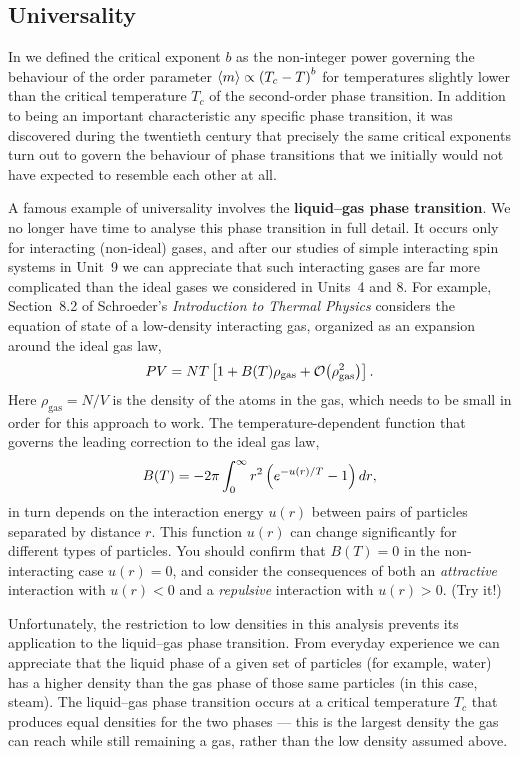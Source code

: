 \subsection{Universality}
In  we defined the critical exponent $b$ as the non-integer power governing the behaviour of the order parameter $\left\langle m \right\rangle \propto \left(T_c - T\right)^b$ for temperatures slightly lower than the critical temperature $T_c$ of the second-order phase transition.
In addition to being an important characteristic any specific phase transition, it was discovered during the twentieth century that precisely the same critical exponents turn out to govern the behaviour of phase transitions that we initially would not have expected to resemble each other at all.

A famous example of universality involves the \textbf{liquid--gas phase transition}.
We no longer have time to analyse this phase transition in full detail.
It occurs only for interacting (non-ideal) gases, and after our studies of simple interacting spin systems in Unit~9 we can appreciate that such interacting gases are far more complicated than the ideal gases we considered in Units~4 and 8.
For example, Section~8.2 of Schroeder's \textit{Introduction to Thermal Physics} considers the equation of state of a low-density interacting gas, organized as an expansion around the ideal gas law,
\begin{equation*}
  PV = NT\left[1 + B(T) \rho_{\text{gas}} + \mathcal O\!\left(\rho_{\text{gas}}^2\right)\right].
\end{equation*}
Here $\rho_{\text{gas}} = N / V$ is the density of the atoms in the gas, which needs to be small in order for this approach to work.
The temperature-dependent function that governs the leading correction to the ideal gas law,
\begin{equation*}
  B(T) = -2\pi \int_0^{\infty} r^2 \left(e^{-u(r) / T} - 1\right) \mathop{dr},
\end{equation*}
in turn depends on the interaction energy $u(r)$ between pairs of particles separated by distance $r$.
This function $u(r)$ can change significantly for different types of particles.
You should confirm that $B(T) = 0$ in the non-interacting case $u(r) = 0$, and consider the consequences of both an \textit{attractive} interaction with $u(r) < 0$ and a \textit{repulsive} interaction with $u(r) > 0$.
(Try it!)

Unfortunately, the restriction to low densities in this analysis prevents its application to the liquid--gas phase transition.
From everyday experience we can appreciate that the liquid phase of a given set of particles (for example, water) has a higher density than the gas phase of those same particles (in this case, steam).
The liquid--gas phase transition occurs at a critical temperature $T_c$ that produces equal densities for the two phases --- this is the largest density the gas can reach while still remaining a gas, rather than the low density assumed above.

